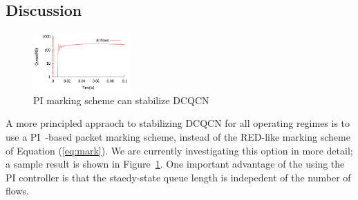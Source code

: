 \subsection{Discussion}

\begin{figure}
\center
\includegraphics[width=0.33\textwidth]{figures/stable_q_85_pi.pdf}
\caption{PI marking scheme can stabilize DCQCN}
\label{fig:dcqcn_pi}
\end{figure}

A more principled appraoch to stabilizing DCQCN for all operating regimes is to
use a PI~\cite{Hollot:PIController}-based packet marking scheme, instead of the
RED-like marking scheme of Equation (\ref{eq:mark}). We are currently
investigating this option in more detail; a sample result is shown in
Figure~\ref{fig:dcqcn_pi}. One important advantage of the using the PI
controller is that the staedy-state queue length is indepedent of the number of
flows.



